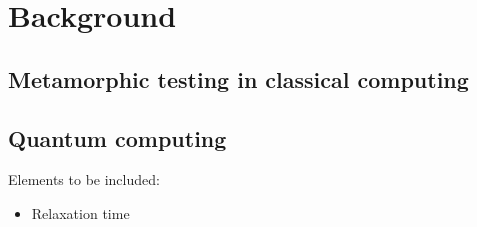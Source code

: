 \cleardoublepage

\chapter{Background}
\label{Ch2:Back}

\section{Metamorphic testing in classical computing}
\label{Ch2.1:Metamorphic}

\section{Quantum computing}
\label{Ch2.2:Quantum}
Elements to be included:
\begin{itemize}
    \item Relaxation time
\end{itemize}
